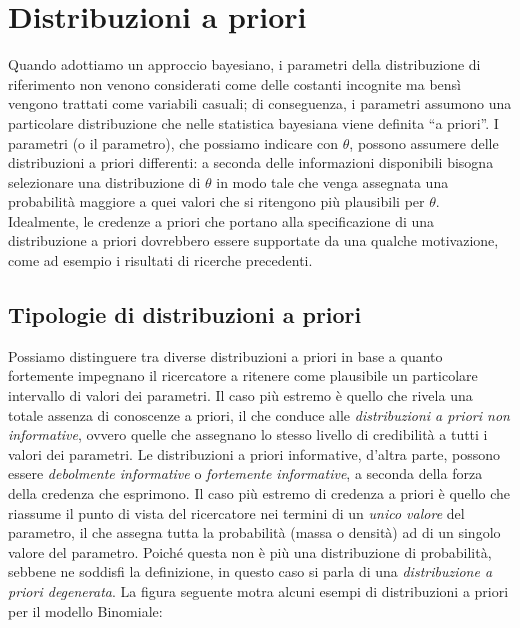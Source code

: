 \documentclass[
  11pt,
]{krantz}
\theoremstyle{definition}
\theoremstyle{definition}
\theoremstyle{definition}
\theoremstyle{definition}
\theoremstyle{remark}
\begin{document}
\hypertarget{distribuzioni-a-priori}{%
\section{Distribuzioni a priori}\label{distribuzioni-a-priori}}

Quando adottiamo un approccio bayesiano, i parametri della distribuzione di riferimento non venono considerati come delle costanti incognite ma bensì vengono trattati come variabili casuali; di conseguenza, i parametri assumono una particolare distribuzione che nelle statistica bayesiana viene definita ``a priori''. I parametri (o il parametro), che possiamo indicare con \(\theta\), possono assumere delle distribuzioni a priori differenti: a seconda delle informazioni disponibili bisogna selezionare una distribuzione di \(\theta\) in modo tale che venga assegnata una probabilità maggiore a quei valori che si ritengono più plausibili per \(\theta\). Idealmente, le credenze a priori che portano alla specificazione di una distribuzione a priori dovrebbero essere supportate da una qualche motivazione, come ad esempio i risultati di ricerche precedenti.

\hypertarget{tipologie-di-distribuzioni-a-priori}{%
\subsection{Tipologie di distribuzioni a priori}\label{tipologie-di-distribuzioni-a-priori}}

Possiamo distinguere tra diverse distribuzioni a priori in base a quanto fortemente impegnano il ricercatore a ritenere come plausibile un particolare intervallo di valori dei parametri. Il caso più estremo è quello che rivela una totale assenza di conoscenze a priori, il che conduce alle \emph{distribuzioni a priori non informative}, ovvero quelle che assegnano lo stesso livello di credibilità a tutti i valori dei parametri. Le distribuzioni a priori informative, d'altra parte, possono essere \emph{debolmente informative} o \emph{fortemente informative}, a seconda della forza della credenza che esprimono. Il caso più estremo di credenza a priori è quello che riassume il punto di vista del ricercatore nei termini di un \emph{unico valore} del parametro, il che assegna tutta la probabilità (massa o densità) ad di un singolo valore del parametro. Poiché questa non è più una distribuzione di probabilità, sebbene ne soddisfi la definizione, in questo caso si parla di una \emph{distribuzione a priori degenerata}. La figura seguente motra alcuni esempi di distribuzioni a priori per il modello Binomiale:
\end{document}
